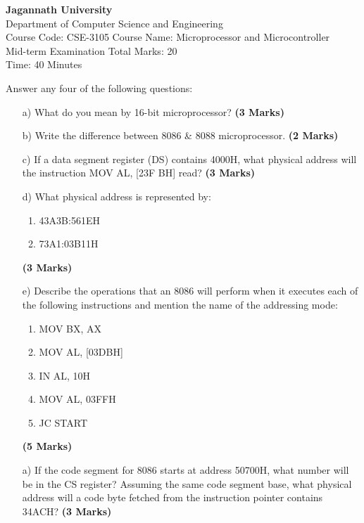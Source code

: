 \documentclass{article}
\begin{document}
\begin{center}
    \textbf{Jagannath University} \\
    Department of Computer Science and Engineering \\
    Course Code: CSE-3105 \hspace{0.2cm} Course Name: Microprocessor and Microcontroller \\
    Mid-term Examination \hspace{0.2cm} Total Marks: 20 \\
    Time: 40 Minutes
\end{center}

\noindent Answer any four of the following questions:

\begin{enumerate}
    \item[a)] What do you mean by 16-bit microprocessor? \hspace{1cm} \textbf{(3 Marks)}
    \item[b)] Write the difference between 8086 & 8088 microprocessor. \hspace{1cm} \textbf{(2 Marks)}
    \item[c)] If a data segment register (DS) contains 4000H, what physical address will the instruction MOV AL, [23F BH] read? \hspace{1cm} \textbf{(3 Marks)}
    \item[d)] What physical address is represented by:
    \begin{enumerate}
        \item 43A3B:561EH
        \item 73A1:03B11H
    \end{enumerate}
    \hspace{1cm} \textbf{(3 Marks)}
    \item[e)] Describe the operations that an 8086 will perform when it executes each of the following instructions and mention the name of the addressing mode:
    \begin{enumerate}
        \item MOV BX, AX
        \item MOV AL, [03DBH]
        \item IN AL, 10H
        \item MOV AL, 03FFH
        \item JC START
    \end{enumerate}
    \hspace{1cm} \textbf{(5 Marks)}
    \item[a)] If the code segment for 8086 starts at address 50700H, what number will be in the CS register? Assuming the same code segment base, what physical address will a code byte fetched from the instruction pointer contains 34ACH? \hspace{1cm} \textbf{(3 Marks)}

\end{enumerate}
\end{document}
